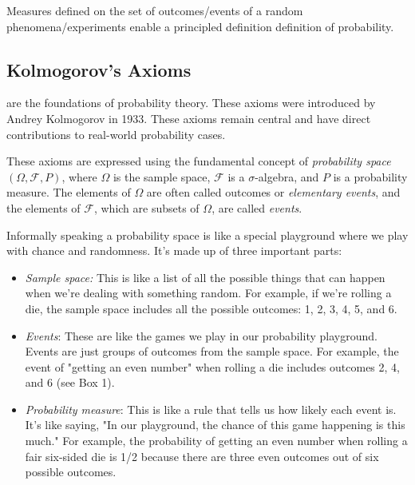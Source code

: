 \documentclass{tufte-handout}
\begin{document}
Measures defined on the set of outcomes/events of a random phenomena/experiments enable a principled definition definition
of probability.



\subsection{Kolmogorov's Axioms}




 are the foundations of probability theory. These axioms were introduced by Andrey Kolmogorov in 1933. 
These axioms remain central and have direct contributions to real-world probability cases. 

These axioms are expressed using the fundamental concept of \textit{probability space}  $(\Omega,\mathscr F, P)$, where $\Omega$ is the sample space, $\mathscr F$ is a $\sigma$-algebra, and $P$ is a probability measure. The elements of $\Omega$ are often called outcomes or  \textit{elementary events}, and the elements of $\mathscr F$, which are subsets of $\Omega$, are called \textit{events}.

Informally speaking a probability space is like a special playground where we play with chance and randomness. It's made up of three important parts:

\begin{itemize}
\item \textit{Sample space:} This is like a list of all the possible things that can happen when we're dealing with something random. For example, if we're rolling a die, the sample space includes all the possible outcomes: 1, 2, 3, 4, 5, and 6.

\item \textit{Events}: These are like the games we play in our probability playground. Events are just groups of outcomes from the sample space. For example, the event of "getting an even number" when rolling a die includes outcomes 2, 4, and 6 (see Box 1).

\item \textit{Probability measure}: This is like a rule that tells us how likely each event is. It's like saying, "In our playground, the chance of this game happening is this much." For example, the probability of getting an even number when rolling a fair six-sided die is 1/2 because there are three even outcomes out of six possible outcomes.
\end{itemize}
\end{document}
